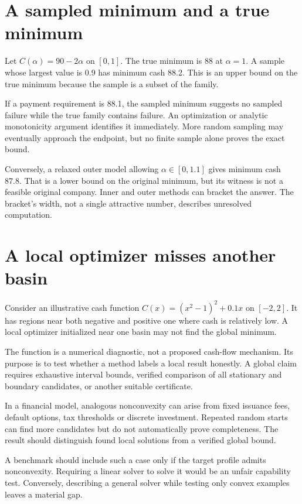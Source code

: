 \section{A sampled minimum and a true minimum}
Let $C(\alpha)=90-2\alpha$ on $[0,1]$. The true minimum is 88 at $\alpha=1$. A sample whose largest value is 0.9 has minimum cash 88.2. This is an upper bound on the true minimum because the sample is a subset of the family.

If a payment requirement is 88.1, the sampled minimum suggests no sampled failure while the true family contains failure. An optimization or analytic monotonicity argument identifies it immediately. More random sampling may eventually approach the endpoint, but no finite sample alone proves the exact bound.

Conversely, a relaxed outer model allowing $\alpha\in[0,1.1]$ gives minimum cash 87.8. That is a lower bound on the original minimum, but its witness is not a feasible original company. Inner and outer methods can bracket the answer. The bracket's width, not a single attractive number, describes unresolved computation.

\section{A local optimizer misses another basin}
Consider an illustrative cash function $C(x)=(x^2-1)^2+0.1x$ on $[-2,2]$. It has regions near both negative and positive one where cash is relatively low. A local optimizer initialized near one basin may not find the global minimum.

The function is a numerical diagnostic, not a proposed cash-flow mechanism. Its purpose is to test whether a method labels a local result honestly. A global claim requires exhaustive interval bounds, verified comparison of all stationary and boundary candidates, or another suitable certificate.

In a financial model, analogous nonconvexity can arise from fixed issuance fees, default options, tax thresholds or discrete investment. Repeated random starts can find more candidates but do not automatically prove completeness. The result should distinguish found local solutions from a verified global bound.

A benchmark should include such a case only if the target profile admits nonconvexity. Requiring a linear solver to solve it would be an unfair capability test. Conversely, describing a general solver while testing only convex examples leaves a material gap.

